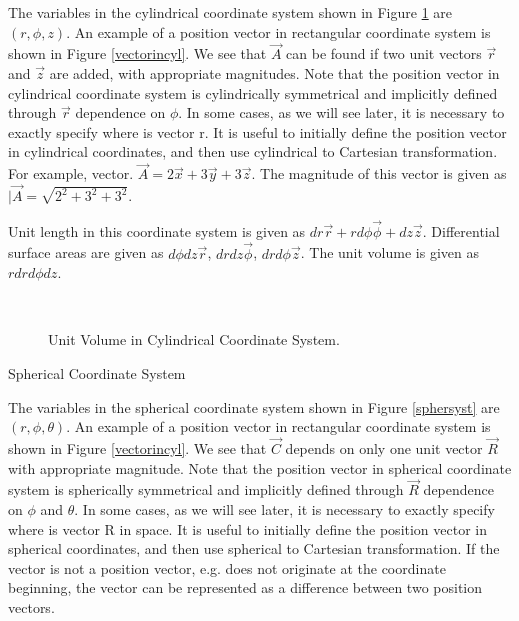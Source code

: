 \begin{description}
The variables in the cylindrical coordinate system shown in Figure \ref{cylsyst} are $(r,\phi,z)$. An example of a position vector in rectangular coordinate system is shown in Figure \ref{vectorincyl}. We see that $\vec{A}$ can be found if two unit vectors $\vec{r}$ and $\vec{z}$ are added, with appropriate magnitudes. Note that the position vector in cylindrical coordinate system is cylindrically symmetrical and implicitly defined through $\vec{r}$ dependence on $\phi$. In some cases, as we will see later, it is necessary to exactly specify where is vector r. It is useful to initially define the position vector in cylindrical coordinates, and then use cylindrical to Cartesian transformation. For example, vector. $\vec{A} = 2 \vec{x} +3 \vec{y}+ 3 \vec{z}  $. The magnitude of this vector is given as $|\vec{A} = \sqrt{2^2+3^2+3^2}$. 




Unit length in this coordinate system is given as $dr \vec{r} + r d\phi \vec{\phi} + dz \vec{z}$. Differential surface areas are given as $d\phi dz \vec{r}$, $dr dz \vec{\phi}$, $dr d\phi \vec{z}$. The unit volume is given as $r dr d\phi dz$.

\begin{figure}[htbp]
\begin{center}
\strut{} \\
\end{center}
\caption{Unit Volume in Cylindrical Coordinate System.}
\label{cylsyst}
\end{figure}




\item{Spherical Coordinate System}





The variables in the spherical coordinate system shown in Figure \ref{sphersyst} are $(r,\phi,\theta)$. An example of a position vector in rectangular coordinate system is shown in Figure \ref{vectorincyl}. We see that $\vec{C}$ depends on only one unit vector $\vec{R}$ with appropriate magnitude. Note that the position vector in spherical coordinate system is spherically symmetrical and implicitly defined through $\vec{R}$ dependence on $\phi$ and $\theta$. In some cases, as we will see later, it is necessary to exactly specify where is vector R in space. It is useful to initially define the position vector in spherical coordinates, and then use spherical to Cartesian transformation. If the vector is not a position vector, e.g. does not originate at the coordinate beginning, the vector can be represented as a difference between two position vectors.


\end{description}
